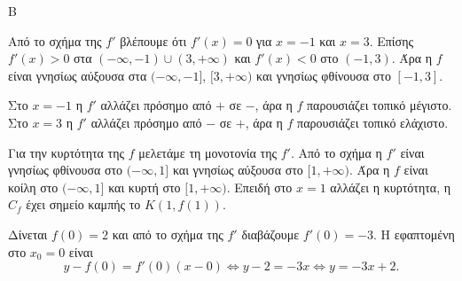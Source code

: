 
\begin{thema}{Β}
\begin{erwthma}
\item Από το σχήμα της $f'$ βλέπουμε ότι $f'(x)=0$ για $x=-1$ και $x=3$. Επίσης $f'(x)>0$ στα $(-\infty,-1)\cup(3,+\infty)$ και $f'(x)<0$ στο $(-1,3)$. Άρα η $f$ είναι γνησίως αύξουσα στα $(-\infty,-1]$, $[3,+\infty)$ και γνησίως φθίνουσα στο $[-1,3]$.

\item Στο $x=-1$ η $f'$ αλλάζει πρόσημο από $+$ σε $-$, άρα η $f$ παρουσιάζει τοπικό μέγιστο. Στο $x=3$ η $f'$ αλλάζει πρόσημο από $-$ σε $+$, άρα η $f$ παρουσιάζει τοπικό ελάχιστο.

\item Για την κυρτότητα της $f$ μελετάμε τη μονοτονία της $f'$. Από το σχήμα η $f'$ είναι γνησίως φθίνουσα στο $(-\infty,1]$ και γνησίως αύξουσα στο $[1,+\infty)$. Άρα η $f$ είναι κοίλη στο $(-\infty,1]$ και κυρτή στο $[1,+\infty)$. Επειδή στο $x=1$ αλλάζει η κυρτότητα, η $C_f$ έχει σημείο καμπής το $K(1,f(1))$.

\item Δίνεται $f(0)=2$ και από το σχήμα της $f'$ διαβάζουμε $f'(0)=-3$. Η εφαπτομένη στο $x_0=0$ είναι
\[
y-f(0)=f'(0)(x-0)\Leftrightarrow y-2=-3x\Leftrightarrow y=-3x+2.
\]
\end{erwthma}
\end{thema}

